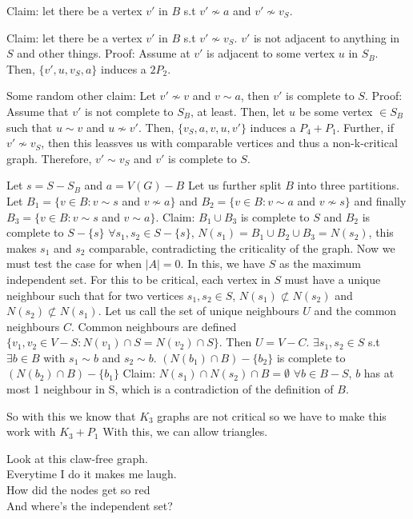 \documentclass[12pt]{article}
\begin{document}
Claim: let there be a vertex $v'$ in $B$ s.t $v' \not \sim a$ and $v' \not \sim v_S$.

Claim: let there be a vertex $v'$ in $B$ s.t $v' \not \sim v_S$. $v'$ is not adjacent to anything in $S$ and other things.
Proof: Assume at $v'$ is adjacent to some vertex $u$ in $S_B$. Then, $\{ v', u, v_S, a \}$ induces a $2P_2$.

Some random other claim: Let $v' \not \sim v$ and $v \sim a$, then $v'$ is complete to $S$.
Proof: Assume that $v'$ is not complete to $S_B$, at least. Then, let $u$ be some vertex $\in S_B$ such that $u \sim v$ and $u \not \sim v'$. Then, $\{v_S, a, v, u, v' \}$ induces a $P_4 + P_1$. Further, if $v' \not \sim v_S$, then this leassves us with comparable vertices and thus a non-k-critical graph. Therefore, $v' \sim v_S$ and $v'$ is complete to $S$.

Let $s = S - S_B$ and $a = V(G) - B$
Let us further split $B$ into three partitions. Let $B_1 = \{v \in B : v \sim s$ and $v \not \sim a \}$ and $B_2  =\{v \in B : v \sim a$ and $v \not \sim s \}$ and finally $B_3 = \{v \in B : v \sim s$ and $v \sim a \}$.
Claim: $B_1 \cup B_3$ is complete to $S$ and $B_2$ is complete to $S - \{s\}$
$\forall s_1, s_2 \in S - \{ s \}$, $N(s_1) = B_1 \cup B_2 \cup B_3 = N(s_2)$, this makes $s_1$ and $s_2$ comparable, contradicting the criticality of the graph.
%
Now we must test the case for when $|A| = 0$. In this, we have $S$ as the maximum independent set. For this to be critical, each vertex in $S$ must have a unique neighbour such that for two vertices $s_1, s_2 \in S$, $N(s_1) \not \subset N(s_2)$ and $N(s_2) \not \subset N(s_1)$.
Let us call the set of unique neighbours $U$ and the common neighbours $C$.
Common neighbours are defined $\{ v_1, v_2 \in V - S : N(v_1) \cap S = N(v_2) \cap S \}$. Then $U = V - C$.
$\exists s_1, s_2 \in S$ s.t $\exists b \in B$ with $s_1 \sim b$ and $s_2 \sim b$.
$(N(b_1) \cap B) - \{b_2\}$ is complete to $(N(b_2) \cap B) - \{b_1\}$
Claim: $N(s_1) \cap N(s_2) \cap B = \emptyset$
$\forall b \in B - S$, $b$ has at most 1 neighbour in S, which is a contradiction of the definition of $B$.

So with this we know that $K_3$ graphs are not critical so we have to make this work with $K_3 + P_1$
With this, we can allow triangles.


Look at this claw-free graph.\\
Everytime I do it makes me laugh.\\
How did the nodes get so red\\
And where's the independent set?\\
\end{document}
